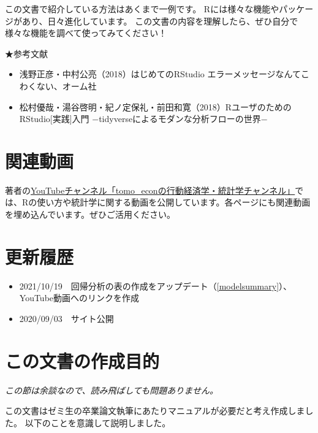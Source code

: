 \documentclass[
]{book}
\providecommand{\tightlist}{%
  \setlength{\itemsep}{0pt}\setlength{\parskip}{0pt}}
\begin{document}
この文書で紹介している方法はあくまで一例です。
Rには様々な機能やパッケージがあり、日々進化しています。
この文書の内容を理解したら、ぜひ自分で様々な機能を調べて使ってみてください！

★参考文献

\begin{itemize}
\tightlist
\item
  浅野正彦・中村公亮（2018）はじめてのRStudio エラーメッセージなんてこわくない、オーム社
\item
  松村優哉・湯谷啓明・紀ノ定保礼・前田和寛（2018）RユーザのためのRStudio{[}実践{]}入門 −tidyverseによるモダンな分析フローの世界−
\end{itemize}

\hypertarget{ux95a2ux9023ux52d5ux753b}{%
\section{関連動画}\label{ux95a2ux9023ux52d5ux753b}}

著者の\href{https://www.youtube.com/channel/UC9s0zn65taPFwir2ekuL8Og}{YouTubeチャンネル「tomo\_econの行動経済学・統計学チャンネル」}では、Rの使い方や統計学に関する動画を公開しています。各ページにも関連動画を埋め込んでいます。ぜひご活用ください。

\hypertarget{ux66f4ux65b0ux5c65ux6b74}{%
\section{更新履歴}\label{ux66f4ux65b0ux5c65ux6b74}}

\begin{itemize}
\tightlist
\item
  2021/10/19　回帰分析の表の作成をアップデート（\ref{modelsummary}）、YouTube動画へのリンクを作成
\item
  2020/09/03　サイト公開
\end{itemize}

\hypertarget{ux3053ux306eux6587ux66f8ux306eux4f5cux6210ux76eeux7684}{%
\section{この文書の作成目的}\label{ux3053ux306eux6587ux66f8ux306eux4f5cux6210ux76eeux7684}}

\emph{この節は余談なので、読み飛ばしても問題ありません。}

この文書はゼミ生の卒業論文執筆にあたりマニュアルが必要だと考え作成しました。
以下のことを意識して説明しました。
\end{document}

